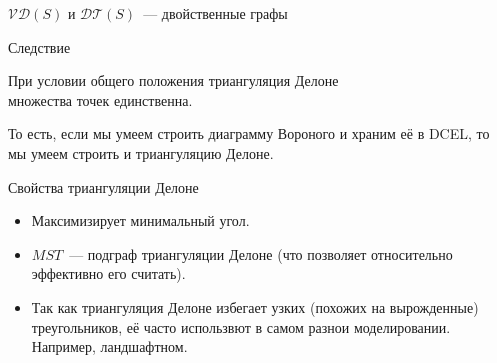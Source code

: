     \begin{frame}{$\mathcal{V}\mathcal{D}(S)$ и $\mathcal{D}\mathcal{T}(S)$~--- двойственные графы}

        \begin{block}{Следствие}

                При условии общего положения триангуляция Делоне \\ множества точек единственна.

        \end{block}

        То есть, если мы умеем строить диаграмму Вороного и храним её в DCEL, то мы умеем строить и триангуляцию
        Делоне.

    \end{frame}

    \begin{frame}{Свойства триангуляции Делоне}

        \begin{itemize}

            \item Максимизирует минимальный угол.

            \item $MST$~--- подграф триангуляции Делоне (что позволяет относительно эффективно его считать).

            \item Так как триангуляция Делоне избегает узких (похожих на вырожденные) треугольников, её часто использвют
                  в самом разнои моделировании. Например, ландшафтном.

        \end{itemize}

    \end{frame}

